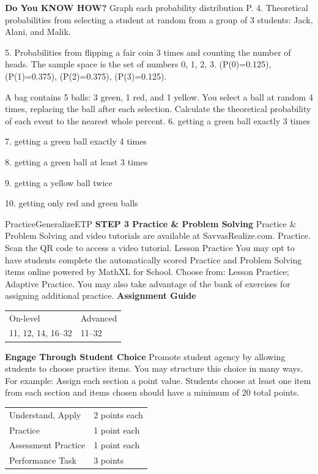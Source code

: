 \documentclass{article}
\newenvironment{concept-summary}{}{}    %
\newenvironment{te-addendum}[2]{}{}     %
\newcommand{\answer}[1]{}               %
\newcommand{\placeholder}[2]{}          %
\begin{document}
\begin{concept-summary}
\textbf{Do You KNOW HOW?}
Graph each probability distribution P.
4. Theoretical probabilities from selecting a student at random from a group of 3 students: Jack, Alani, and Malik.
\answer{See graph.}
\placeholder{graph}{Summary 4 answer: horizontal Student categories Jack, Alani, Malik; orange separated bars each 1/3. Vertical Probability labeled 0.0 through 0.5 by .1, dotted horizontal grid, no arrows.}
5. Probabilities from flipping a fair coin 3 times and counting the number of heads. The sample space is the set of numbers 0, 1, 2, 3. (P(0)=0.125), (P(1)=0.375), (P(2)=0.375), (P(3)=0.125).
\answer{See graph.}
\placeholder{graph}{Summary 5 answer: horizontal Number of Heads at 0,1,2,3; orange separated bars .125,.375,.375,.125. Vertical Probability 0.0 through 0.5 by .1, dotted grid, no arrows.}
A bag contains 5 balls: 3 green, 1 red, and 1 yellow. You select a ball at random 4 times, replacing the ball after each selection. Calculate the theoretical probability of each event to the nearest whole percent.
6. getting a green ball exactly 3 times
\answer{35\%}
7. getting a green ball exactly 4 times
\answer{13\%}
8. getting a green ball at least 3 times
\answer{48\%}
9. getting a yellow ball twice
\answer{15\%}
10. getting only red and green balls
\answer{41\%}
\end{concept-summary}
\begin{te-addendum}{Practice}{GeneralizeETP}
\textbf{STEP 3 Practice \& Problem Solving}
Practice \& Problem Solving and video tutorials are available at SavvasRealize.com. Practice.
Scan the QR code to access a video tutorial.
Lesson Practice You may opt to have students complete the automatically scored Practice and Problem Solving items online powered by MathXL for School.
Choose from: Lesson Practice; Adaptive Practice.
You may also take advantage of the bank of exercises for assigning additional practice.
\textbf{Assignment Guide}
\begin{tabular}{ll}
On-level & Advanced \\
11, 12, 14, 16--32 & 11--32 \\
\end{tabular}
\textbf{Engage Through Student Choice}
Promote student agency by allowing students to choose practice items.
You may structure this choice in many ways.
For example:
Assign each section a point value. Students choose at least one item from each section and items chosen should have a minimum of 20 total points.
\begin{tabular}{ll}
Understand, Apply & 2 points each \\
Practice & 1 point each \\
Assessment Practice & 1 point each \\
Performance Task & 3 points \\
\end{tabular}
\end{te-addendum}
\end{document}
